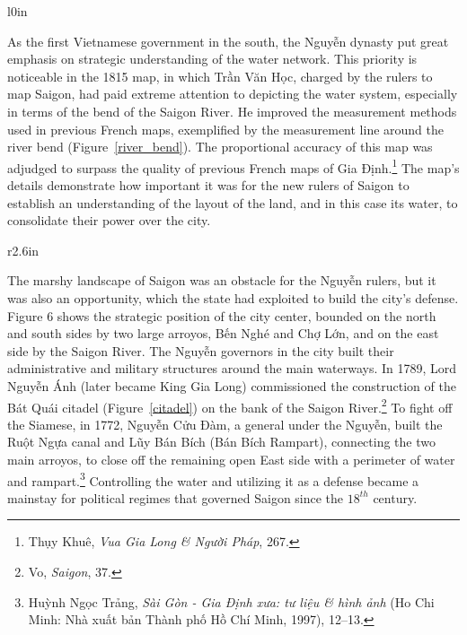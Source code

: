 \en
\begin{wrapfigure}{l}{0in}
\caption{The bend of the Saigon River depicted by \vi Trần Văn Học}
\label{river_bend}
\end{wrapfigure}
As the first Vietnamese government in the south, the \vi Nguyễn dynasty put great emphasis on strategic understanding of the water network. This priority is noticeable in the 1815 map, in which Trần Văn Học, charged by the rulers to map Saigon, had paid extreme attention to depicting the water system, especially in terms of the bend of the Saigon River. He improved the measurement methods used in previous French maps, exemplified by the measurement line around the river bend (Figure~\ref{river_bend}). The proportional accuracy of this map was adjudged to surpass the quality of previous French maps of Gia Định.\footnote{Thụy Khuê, \textit{Vua Gia Long \& Người Pháp}, 267.} The map’s details demonstrate how important it was for the new rulers of Saigon to establish an understanding of the layout of the land, and in this case its water, to consolidate their power over the city.

\en
\begin{wrapfigure}{r}{2.6in}
\caption{The \vi Bát Quái citadel}
\label{citadel}
\end{wrapfigure}
The marshy landscape of Saigon was an obstacle for the \vi Nguyễn rulers, but it was also an opportunity, which the state had exploited to build the city’s defense. Figure 6 shows the strategic position of the city center, bounded on the north and south sides by two large arroyos, \vi Bến Nghé and Chợ Lớn, and on the east side by the Saigon River. The \vi Nguyễn governors in the city built their administrative and military structures around the main waterways. In 1789, Lord \vi Nguyễn Ánh (later became King Gia Long) commissioned the construction of the Bát Quái citadel (Figure~\ref{citadel}) on the bank of the Saigon River.\footnote{Vo, \textit{Saigon}, 37.} To fight off the Siamese, in 1772, Nguyễn Cửu Đàm, a general under the Nguyễn, built the Ruột Ngựa canal and Lũy Bán Bích (Bán Bích Rampart), connecting the two main arroyos, to close off the remaining open East side with a perimeter of water and rampart.\footnote{Huỳnh Ngọc Trảng, \textit{Sài Gòn - Gia Định xưa: tư liệu \& hình ảnh} (Ho Chi Minh: Nhà xuất bản Thành phố Hồ Chí Minh, 1997), 12–13.} Controlling the water and utilizing it as a defense became a mainstay for political regimes that governed Saigon since the $18^{th}$ century.

